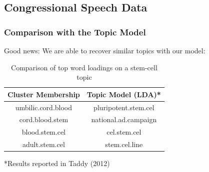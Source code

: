 \documentclass[presentation]{beamer}
\begin{document}
\subsection{Congressional Speech Data}
%


\begin{frame}
\frametitle{Comparison with the Topic Model}
Good news: We are able to recover similar topics with our model:
\begin{table}[!htbp]
\caption{Comparison of top word loadings on a stem-cell topic} \label{tab:title}
\centering
\begin{tabular}{  c  c }
Cluster Membership & Topic Model (LDA)* \\
\hline
umbilic.cord.blood & pluripotent.stem.cel \\
cord.blood.stem  & national.ad.campaign \\
blood.stem.cel   & cel.stem.cel \\
adult.stem.cel & stem.cel.line \\
\end{tabular}
\end{table}
*Results reported in Taddy (2012)
\end{frame}
\end{document}
